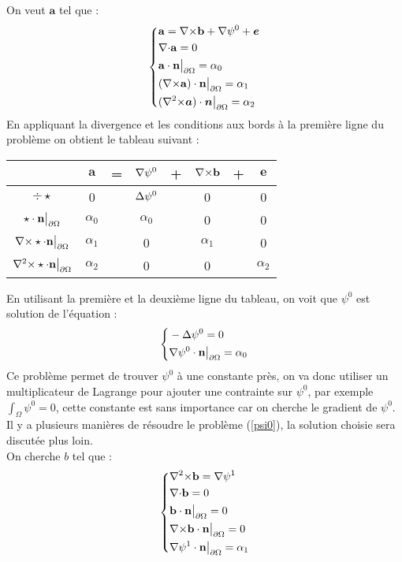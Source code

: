 On veut $\mathbf{a}$ tel que :
\begin{equation}\label{a}
\left\{\begin{aligned}
&\mathbf{a}={\nabla\times} \mathbf{b}+{\nabla}\psi^0+\bm{e}\\
&{\nabla\cdot} \mathbf{a} =0\\
&\mathbf{a}\cdot \mathbf{n}{\big\rvert_{\partial\Omega}} = \alpha_0\\
&({\nabla\times} \mathbf{a})\cdot \mathbf{n}{\big\rvert_{\partial\Omega}} = \alpha_1\\
&({\nabla^2\times} \bm{a})\cdot \bm{n}{\big\rvert_{\partial\Omega}} = \alpha_2
\end{aligned}\right.
\end{equation}
En appliquant la divergence et les conditions aux bords à la première ligne du problème on obtient le tableau suivant :
\begin{center}
\begin{tabular}{c|ccccccc}
& $\mathbf{a}$ & = & ${\nabla}\psi^0$ & + & ${\nabla\times} \mathbf{b}$ & + & $\bm{e}$ \\ \hline
$\div\star$ & 0 & & ${\Delta}\psi^0$ & & 0 & & 0\\ \hline
$\star\cdot \mathbf{n}{\big\rvert_{\partial\Omega}}$ & $\alpha_0$ & & $\alpha_0$ & & 0 & & 0\\ \hline
${\nabla\times}\star\cdot \mathbf{n}{\big\rvert_{\partial\Omega}}$ & $\alpha_1$ & & 0 & & $\alpha_1$ & & 0\\ \hline
${\nabla^2\times}\star\cdot \mathbf{n}{\big\rvert_{\partial\Omega}}$ & $\alpha_2$ & & 0 & & 0 & & $\alpha_2$
\end{tabular}
\end{center}
En utilisant la première et la deuxième ligne du tableau, on voit que $\psi^0$ est solution de l'équation :
\begin{equation}\label{psi0}
\left\{\begin{aligned}
&-{\Delta}\psi^0 = 0\\
&{\nabla}\psi^0\cdot \mathbf{n}{\big\rvert_{\partial\Omega}}=\alpha_0
\end{aligned}\right.
\end{equation}
Ce problème permet de trouver $\psi^0$ à une constante près, on va donc utiliser un multiplicateur de Lagrange pour ajouter une contrainte sur $\psi^0$, par exemple $\int_\Omega \psi^0 = 0$, cette constante est sans importance car on cherche le gradient de $\psi^0$.\\
Il y a plusieurs manières de résoudre le problème (\ref{psi0}), la solution choisie sera discutée plus loin.\\

On cherche $b$ tel que :
\begin{equation}\label{curlb}
\left\{\begin{aligned}
&{\nabla^2\times} \mathbf{b} = {\nabla}\psi^1\\
&{\nabla\cdot} \mathbf{b} = 0\\
&\mathbf{b}\cdot \mathbf{n}{\big\rvert_{\partial\Omega}} = 0\\
&{\nabla\times} \mathbf{b}\cdot \mathbf{n}{\big\rvert_{\partial\Omega}} = 0\\
&{\nabla}\psi^1\cdot \mathbf{n}{\big\rvert_{\partial\Omega}} = \alpha_1
\end{aligned}\right.
\end{equation}


